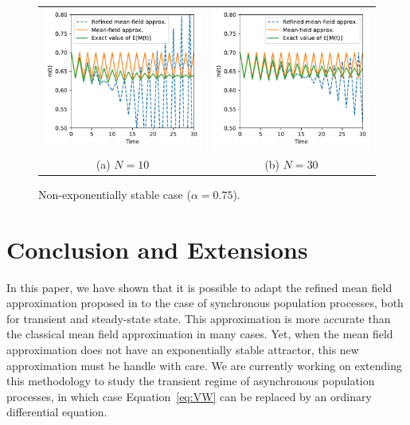 \documentclass{sig-alternate-per}
\begin{document}
\begin{figure}[ht]
  \centering
  \begin{tabular}{@{}c@{}c@{}}
    \includegraphics[width=.5\linewidth]{unstable1D_a75_N10}
    &\includegraphics[width=.5\linewidth]{unstable1D_a75_N30}\\[-5pt]
    (a) $N=10$ & (b) $N=30$\vspace{-.3cm}
  \end{tabular}
  \caption{Non-exponentially stable case ($\alpha=0.75$). }
  \label{fig:unstable}
\end{figure}

\section{Conclusion and Extensions}

In this paper, we have shown that it is possible to adapt the refined
mean field approximation proposed in \cite{gast2017refined} to the
case of synchronous population processes, both for transient and
steady-state state. This approximation is more accurate than the
classical mean field approximation in many cases. Yet, when the mean
field approximation does not have an exponentially stable attractor,
this new approximation must be handle with care. We are currently
working on extending this methodology to study the transient regime of
asynchronous population processes, in which case
Equation~\eqref{eq:VW} can be replaced by an ordinary differential
equation.

\small 
% 


\end{document}
